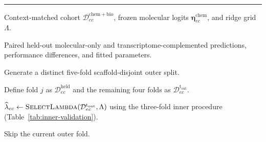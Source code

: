 \documentclass[11pt,a4paper]{article}
\begin{document}
\begin{landscape}
\begingroup

\begin{table}[p]
\captionsetup{font=small,width=\linewidth,skip=6pt}
\caption{\textbf{Repeated outer-loop evaluation.}
Twenty repetitions of five-fold outer cross-validation define 100
outer-fold evaluations for each endpoint--context cohort. Molecular-only
and transcriptome-complemented predictions are evaluated on the same
held-out compounds, with all fitted quantities estimated exclusively
from the corresponding outer-training partition. \textbf{ALT TEXT:}
Algorithm table showing 20 repetitions of five-fold outer
cross-validation, including scaffold-disjoint splitting, inner-loop ridge
selection, outer-training calibration and transcriptomic fitting, and
paired held-out performance evaluation.}
\label{tab:outer-validation}

\fontsize{11}{12}\selectfont
\setlength{\parskip}{0pt}
\setlength{\abovedisplayskip}{3pt}
\setlength{\belowdisplayskip}{3pt}

\noindent\rule{\linewidth}{0.8pt}\par\nobreak

\begin{algorithmic}[1]

\Require Context-matched cohort
$\mathcal D^{\mathrm{chem+bio}}_{ec}$,
frozen molecular logits
$\boldsymbol\eta^{\mathrm{chem}}_{ec}$,
and ridge grid $\Lambda$.

\Ensure Paired held-out molecular-only and transcriptome-complemented
predictions, performance differences, and fitted parameters.


    \State Generate a distinct five-fold scaffold-disjoint outer split.


        \State Define fold $j$ as
        $\mathcal D_{ec}^{\mathrm{held}}$
        and the remaining four folds as
        $\mathcal D_{ec}^{\mathrm{t_{out}}}$.

        \State
        $\widehat\lambda_{ec}
        \gets
        \Call{SelectLambda}
        {\mathcal D_{ec}^{\mathrm{t_{out}}},\Lambda}$
        using the three-fold inner procedure
        (Table~\ref{tab:inner-validation}).

            \State Skip the current outer fold.
        \EndIf


\end{algorithmic}
\end{table}
\end{landscape}
\end{document}
